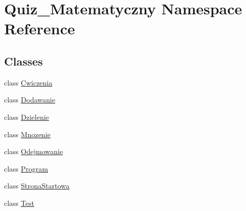\hypertarget{namespace_quiz___matematyczny}{}\section{Quiz\+\_\+\+Matematyczny Namespace Reference}
\label{namespace_quiz___matematyczny}
\subsection*{Classes}
\begin{DoxyCompactItemize}
\item 
class \mbox{\hyperlink{class_quiz___matematyczny_1_1_cwiczenia}{Cwiczenia}}
\item 
class \mbox{\hyperlink{class_quiz___matematyczny_1_1_dodawanie}{Dodawanie}}
\item 
class \mbox{\hyperlink{class_quiz___matematyczny_1_1_dzielenie}{Dzielenie}}
\item 
class \mbox{\hyperlink{class_quiz___matematyczny_1_1_mnozenie}{Mnozenie}}
\item 
class \mbox{\hyperlink{class_quiz___matematyczny_1_1_odejmowanie}{Odejmowanie}}
\item 
class \mbox{\hyperlink{class_quiz___matematyczny_1_1_program}{Program}}
\item 
class \mbox{\hyperlink{class_quiz___matematyczny_1_1_strona_startowa}{Strona\+Startowa}}
\item 
class \mbox{\hyperlink{class_quiz___matematyczny_1_1_test}{Test}}
\end{DoxyCompactItemize}
